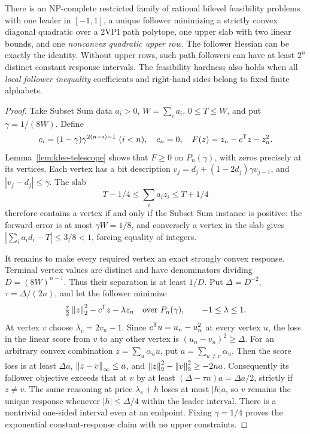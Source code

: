 \begin{theorem}
\label{thm:follower-path-hardness}
There is an NP-complete restricted family of rational bilevel feasibility
problems with one leader in \([-1,1]\), a unique follower minimizing a strictly
convex diagonal quadratic over a 2VPI path polytope, one upper slab with two
linear bounds, and one \emph{nonconvex quadratic upper row}. The follower
Hessian can be exactly the identity. Without upper rows, such path followers
can have at least \(2^n\) distinct constant response intervals.
The feasibility hardness also holds when all \emph{local follower inequality}
coefficients and right-hand sides belong to fixed finite alphabets.
\end{theorem}
\begin{proof}
Take Subset Sum data \(a_i>0\), \(W=\sum_i a_i\), \(0\le T\le W\), and put
\(\gamma=1/(8W)\). Define
\[
 c_i=(1-\gamma)\gamma^{2(n-i)-1}\ (i<n),\quad c_n=0,\quad
 F(z)=z_n-c\trans z-z_n^2.
\]
Lemma~\ref{lem:klee-telescope} shows that \(F\ge0\) on \(P_n(\gamma)\), with
zeros precisely at its vertices. Each vertex has a bit description
\(v_j=d_j+(1-2d_j)\gamma v_{j-1}\), and
\(|v_j-d_j|\le\gamma\). The slab
\begin{equation}\label{eq:klee-slab}
 T-1/4\le\sum_i a_i z_i\le T+1/4
\end{equation}
therefore contains a vertex if and only if the Subset Sum instance is positive:
the forward error is at most \(\gamma W=1/8\), and conversely a vertex in
the slab gives \(|\sum_i a_i d_i-T|\le3/8<1\), forcing equality of integers.

It remains to make every required vertex an exact strongly convex response.
Terminal vertex values are distinct and have denominators dividing
\(D=(8W)^{n-1}\). Thus their separation is at least \(1/D\). Put
\(\Delta=D^{-2}\), \(\tau=\Delta/(2n)\), and let the follower minimize
\begin{equation}\label{eq:klee-quadratic-follower}
 \tfrac\tau2\left\lVert z\right\rVert_2^2-c^{\mathsf T} z-\lambda z_n
 \quad\text{over }P_n(\gamma),\qquad -1\le\lambda\le1.
\end{equation}
At vertex \(v\) choose \(\lambda_v=2v_n-1\). Since
\(c^{\mathsf T} u=u_n-u_n^2\) at every vertex \(u\), the loss in the linear score
from \(v\) to any other vertex is \((u_n-v_n)^2\ge\Delta\).
For an arbitrary convex combination \(z=\sum_u\alpha_u u\), put
\(a=\sum_{u\ne v}\alpha_u\). Then the score loss is at least \(\Delta a\),
\(\left\lVert z-v\right\rVert_\infty\le a\), and
\(\left\lVert z\right\rVert_2^2-\left\lVert v\right\rVert_2^2\ge-2na\). Consequently its follower objective
exceeds that at \(v\) by at least \((\Delta-\tau n)a=\Delta a/2\), strictly
if \(z\ne v\). The same reasoning at price \(\lambda_v+h\) loses at most
\(|h|a\), so \(v\) remains the unique response whenever \(|h|\le\Delta/4\)
within the leader interval. There is a nontrivial one-sided interval even at
an endpoint. Fixing \(\gamma=1/4\) proves the exponential constant-response
claim with no upper constraints.


\end{proof}
